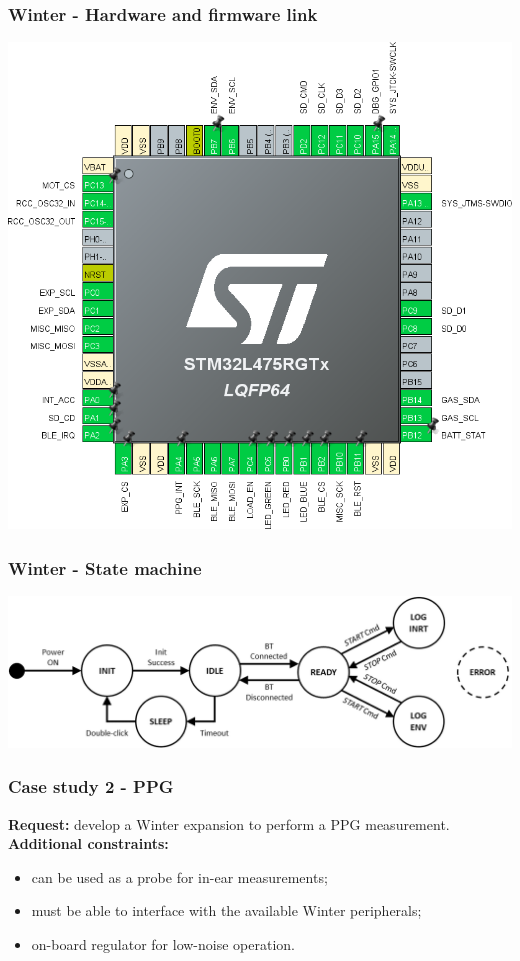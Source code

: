 \documentclass[11pt,xcolor=table,aspectratio=169]{beamer}
\begin{document}
	\begin{frame}
		\frametitle{Winter - Hardware and firmware link}
		\centering
		\includegraphics[width=.5\textwidth]{media/winter_cube.png}
	\end{frame}

	\begin{frame}
		\frametitle{Winter - State machine}
		\centering
		\includegraphics[width=.9\textwidth]{media/state_diagram.png}
	\end{frame}


	\begin{frame}
		\frametitle{Case study 2 - PPG}
		\textbf{Request:} develop a Winter expansion to perform a PPG measurement.\\
		\textbf{Additional constraints:}
		\begin{itemize}
			\item can be used as a probe for in-ear measurements;
			\item must be able to interface with the available Winter peripherals;
			\item on-board regulator for low-noise operation.
		\end{itemize}
	\end{frame}
\end{document}
